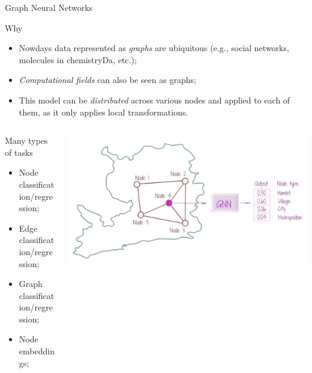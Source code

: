 \documentclass[presentation]{beamer}\mode<presentation>{\usetheme{AMSBolognaFC}}
\begin{document}
\begin{frame}[allowframebreaks]{Graph Neural Networks}

\begin{block}{Why}
	\begin{itemize}
		\item Nowdays data represented as \emph{graphs} are ubiquitous 
			(e.g., social networks, molecules in chemistryDa, etc.);
		\item \emph{Computational fields} can also be seen as graphs;
		\item This model can be \emph{distributed} across various nodes and applied to each of them, 
			as it only applies local transformations.
	\end{itemize}
\end{block}

\begin{columns}
	\begin{column}{0.5\textwidth}
		\begin{alertblock}{Many types of tasks}
			\begin{itemize}
				\item Node classification/regression;
				\item Edge classification/regression;
				\item Graph classification/regression;
				\item Node embeddings;
			\end{itemize}
		\end{alertblock}
	\end{column}
	\begin{column}{0.5\textwidth}
		\includegraphics[width=\textwidth]{img/gnn.png}
	\end{column}
\end{columns}



\end{frame}
\end{document}
